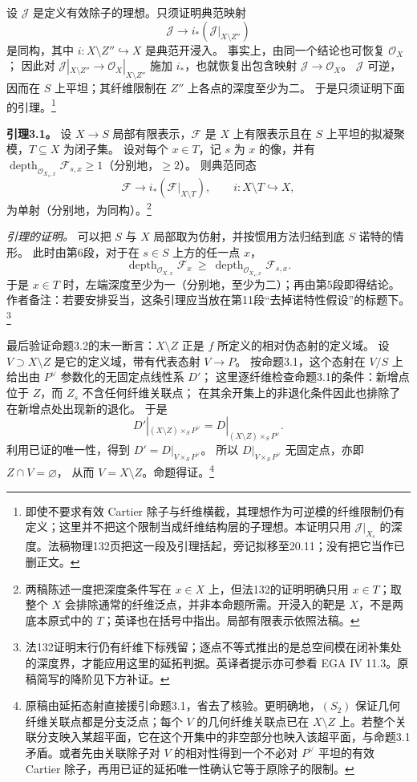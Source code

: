 \documentclass[openany,fontset=fandol]{ctexbook}
\DeclareMathOperator{\depth}{depth}
\newcommand{\OO}{\mathcal O}
\newcommand{\FF}{\mathcal F}
\newcommand{\JJ}{\mathcal J}
\begin{document}
设 \(\JJ\) 是定义有效除子的理想。只须证明典范映射
\[
 \JJ\longrightarrow i_*(\JJ|_{X\setminus Z''})
\]
是同构，其中 \(i:X\setminus Z''\hookrightarrow X\) 是典范开浸入。
事实上，由同一个结论也可恢复 \(\OO_X\)；
因此对 \(\JJ|_{X\setminus Z''}\to\OO_X|_{X\setminus Z''}\) 施加 \(i_*\)，也就恢复出包含映射 \(\JJ\to\OO_X\)。
\(\JJ\) 可逆，因而在 \(S\) 上平坦；其纤维限制在 \(Z''\) 上各点的深度至少为二。
于是只须证明下面的引理。\footnote{即使不要求有效 Cartier 除子与纤维横截，其理想作为可逆模的纤维限制仍有定义；这里并不把这个限制当成纤维结构层的子理想。本证明只用 \(\JJ|_{X_s}\) 的深度。法稿物理132页把这一段及引理括起，旁记拟移至20.11；没有把它当作已删正文。}

\medskip\noindent\textbf{引理3.1。}
设 \(X\to S\) 局部有限表示，\(\FF\) 是 \(X\) 上有限表示且在 \(S\) 上平坦的拟凝聚模，\(T\subseteq X\) 为闭子集。
设对每个 \(x\in T\)，记 \(s\) 为 \(x\) 的像，并有
\(\depth_{\OO_{X_s,x}}\FF_{s,x}\geq1\)（分别地，\(\geq2\)）。
则典范同态
\[
 \FF\longrightarrow i_*(\FF|_{X\setminus T}),\qquad
 i:X\setminus T\hookrightarrow X,
\]
为单射（分别地，为同构）。\footnote{两稿陈述一度把深度条件写在 \(x\in X\) 上，但法132的证明明确只用 \(x\in T\)；取整个 \(X\) 会排除通常的纤维泛点，并非本命题所需。开浸入的靶是 \(X\)，不是两底本原式中的 \(T\)；英译也在括号中指出。局部有限表示依照法稿。}

\emph{引理的证明。}
可以把 \(S\) 与 \(X\) 局部取为仿射，并按惯用方法归结到底 \(S\) 诺特的情形。
此时由第6段，对于在 \(s\in S\) 上方的任一点 \(x\)，
\[
 \depth_{\OO_{X,x}}\FF_x\ \geq\ \depth_{\OO_{X_s,x}}\FF_{s,x}.
\]
于是 \(x\in T\) 时，左端深度至少为一（分别地，至少为二）；再由第5段即得结论。
作者备注：若要安排妥当，这条引理应当放在第11段“去掉诺特性假设”的标题下。\footnote{法132证明末行仍有纤维下标残留；逐点不等式推出的是总空间模在闭补集处的深度界，才能应用这里的延拓判据。英译者提示亦可参看 EGA IV 11.3。原稿简写的降阶见下方补证。}

最后验证命题3.2的末一断言：\(X\setminus Z\) 正是 \(f\) 所定义的相对伪态射的定义域。
设 \(V\supset X\setminus Z\) 是它的定义域，带有代表态射 \(V\to P\)。
按命题3.1，这个态射在 \(V/S\) 上给出由 \(P^\vee\) 参数化的无固定点线性系 \(D'\)；
这里逐纤维检查命题3.1的条件：新增点位于 \(Z\)，而 \(Z_s\) 不含任何纤维关联点；
在其余开集上的非退化条件因此也排除了在新增点处出现新的退化。
于是
\[
 D'|_{(X\setminus Z)\times_S P^\vee}
 = D|_{(X\setminus Z)\times_S P^\vee}.
\]
利用已证的唯一性，得到 \(D'=D|_{V\times_S P^\vee}\)。
所以 \(D|_{V\times_S P^\vee}\) 无固定点，亦即 \(Z\cap V=\varnothing\)，
从而 \(V=X\setminus Z\)。命题得证。\footnote{原稿由延拓态射直接援引命题3.1，省去了核验。更明确地，\((S_2)\) 保证几何纤维关联点都是分支泛点；每个 \(V\) 的几何纤维关联点已在 \(X\setminus Z\) 上。若整个关联分支映入某超平面，它在这个开集中的非空部分也映入该超平面，与命题3.1矛盾。或者先由关联除子对 \(V\) 的相对性得到一个不必对 \(P^\vee\) 平坦的有效 Cartier 除子，再用已证的延拓唯一性确认它等于原除子的限制。}
\end{document}
